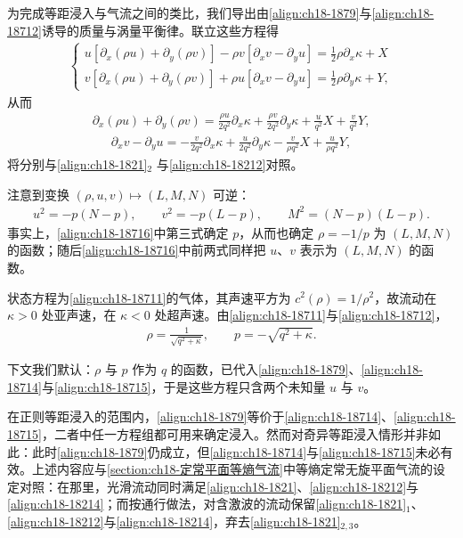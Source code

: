 \documentclass[../../main.tex]{subfiles}
\begin{document}
为完成等距浸入与气流之间的类比，我们导出由\eqref{align:ch18-1879}与\eqref{align:ch18-18712}诱导的质量与涡量平衡律。联立这些方程得
\begin{align}
\begin{cases}
u[\partial_x(\rho u)+\partial_y(\rho v)]-\rho v[\partial_x v-\partial_y u]=\frac12\rho\partial_x\kappa+X\\
v[\partial_x(\rho u)+\partial_y(\rho v)]+\rho u[\partial_x v-\partial_y u]=\frac12\rho\partial_y\kappa+Y,
\end{cases}
\label{align:ch18-18713}
\end{align}
从而
\begin{align}
\partial_x(\rho u)+\partial_y(\rho v)=\frac{\rho u}{2q^2}\partial_x\kappa+\frac{\rho v}{2q^2}\partial_y\kappa+\frac{u}{q^2}X+\frac{v}{q^2}Y,
\label{align:ch18-18714}
\end{align}
\begin{align}
\partial_xv-\partial_yu=-\frac{v}{2q^2}\partial_x\kappa+\frac{u}{2q^2}\partial_y\kappa-\frac{v}{\rho q^2}X+\frac{u}{\rho q^2}Y,
\label{align:ch18-18715}
\end{align}
将分别与\eqref{align:ch18-1821}$_2$ 与\eqref{align:ch18-18212}对照。

注意到变换 $(\rho,u,v)\mapsto(L,M,N)$ 可逆：
\begin{align}
u^2=-p(N-p),\qquad v^2=-p(L-p),\qquad M^2=(N-p)(L-p).
\label{align:ch18-18716}
\end{align}
事实上，\eqref{align:ch18-18716}中第三式确定 $p$，从而也确定 $\rho=-1/p$ 为 $(L,M,N)$ 的函数；随后\eqref{align:ch18-18716}中前两式同样把 $u$、$v$ 表示为 $(L,M,N)$ 的函数。

状态方程为\eqref{align:ch18-18711}的气体，其声速平方为 $c^2(\rho)=1/\rho^2$，故流动在 $\kappa>0$ 处亚声速，在 $\kappa<0$ 处超声速。由\eqref{align:ch18-18711}与\eqref{align:ch18-18712}，
\begin{align}
\rho=\frac{1}{\sqrt{q^2+\kappa}},\qquad p=-\sqrt{q^2+\kappa}.
\label{align:ch18-18717}
\end{align}

下文我们默认：$\rho$ 与 $p$ 作为 $q$ 的函数，已代入\eqref{align:ch18-1879}、\eqref{align:ch18-18714}与\eqref{align:ch18-18715}，于是这些方程只含两个未知量 $u$ 与 $v$。

在正则等距浸入的范围内，\eqref{align:ch18-1879}等价于\eqref{align:ch18-18714}、\eqref{align:ch18-18715}，二者中任一方程组都可用来确定浸入。然而对奇异等距浸入情形并非如此：此时\eqref{align:ch18-1879}仍成立，但\eqref{align:ch18-18714}与\eqref{align:ch18-18715}未必有效。上述内容应与\cref{section:ch18-定常平面等熵气流}中等熵定常无旋平面气流的设定对照：在那里，光滑流动同时满足\eqref{align:ch18-1821}、\eqref{align:ch18-18212}与\eqref{align:ch18-18214}；而按通行做法，对含激波的流动保留\eqref{align:ch18-1821}$_1$、\eqref{align:ch18-18212}与\eqref{align:ch18-18214}，弃去\eqref{align:ch18-1821}$_{2,3}$。
\end{document}
